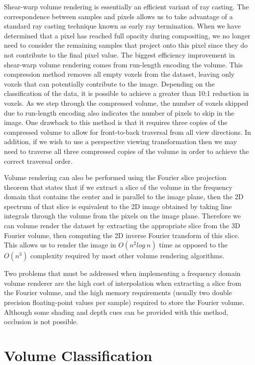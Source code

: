 Shear-warp volume rendering is essentially an efficient variant of ray casting. The correspondence between samples and pixels allows us to take advantage of a standard ray casting technique known as early ray termination. When we have determined that a pixel has reached full opacity during compositing, we no longer need to consider the remaining samples that project onto this pixel since they do not contribute to the final pixel value. The biggest efficiency improvement in shear-warp volume rendering comes from run-length encoding the volume. This compression method removes all empty voxels from the dataset, leaving only voxels that can potentially contribute to the image. Depending on the classification of the data, it is possible to achieve a greater than 10:1 reduction in voxels. As we step through the compressed volume, the number of voxels skipped due to run-length encoding also indicates the number of pixels to skip in the image. One drawback to this method is that it requires three copies of the compressed volume to allow for front-to-back traversal from all view directions. In addition, if we wish to use a perspective viewing transformation then we may need to traverse all three compressed copies of the volume in order to achieve the correct traversal order.

Volume rendering can also be performed using the Fourier slice projection theorem \cite{Totsuka92} that states that if we extract a slice of the volume in the frequency domain that contains the center and is parallel to the image plane, then the 2D spectrum of that slice is equivalent to the 2D image obtained by taking line integrals through the volume from the pixels on the image plane. Therefore we can volume render the dataset by extracting the appropriate slice from the 3D Fourier volume, then computing the 2D inverse Fourier transform of this slice. This allows us to render the image in $O(n^2log\ n)$ time as opposed to the $O(n^3)$ complexity required by most other volume rendering algorithms.

Two problems that must be addressed when implementing a frequency domain volume renderer are the high cost of interpolation when extracting a slice from the Fourier volume, and the high memory requirements (usually two double precision floating-point values per sample) required to store the Fourier volume. Although some shading and depth cues can be provided with this method, occlusion is not possible.

\section{Volume Classification}

